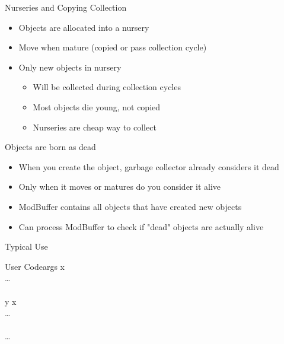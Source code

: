 \documentclass{beamer}
\begin{document}
\begin{frame}{Nurseries and Copying Collection}
	\begin{itemize}
		\item Objects are allocated into a nursery
		\item Move when mature (copied or pass collection cycle)
		\item Only new objects in nursery
			\begin{itemize}
				\item Will be collected during collection cycles
				\item Most objects die young, not copied
				\item Nurseries are cheap way to collect
			\end{itemize}
	\end{itemize}
\end{frame}

\begin{frame}{Objects are born as dead}
	\begin{itemize}
		\item When you create the object, garbage collector already considers it dead
		\item Only when it moves or matures do you consider it alive
		\item ModBuffer contains all objects that have created new objects
		\item Can process ModBuffer to check if "dead" objects are actually alive
	\end{itemize}
\end{frame}

\addtocounter{section}{1}


\begin{frame}{Typical Use}
\begin{pseudocode}{User Code}{args}
\MAIN
	x \GETS {}\\
	\ldots\\
	\\
	y \GETS x\\
	\ldots\\
	\\
	\ldots\\
	\\
\ENDMAIN
\end{pseudocode}
\end{frame}

\addtocounter{section}{1}
\end{document}
